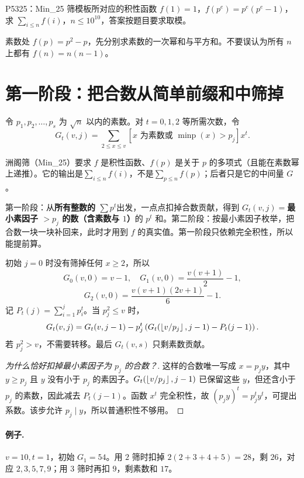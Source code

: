 \begin{problem}{P5325：Min\_25 筛模板所对应的积性函数}
$f(1)=1$，$f(p^e)=p^e(p^e-1)$，求 $\sum_{i\le n}f(i)$，$n\le10^{10}$，答案按题目要求取模。
\end{problem}
\hint 素数处 $f(p)=p^2-p$，先分别求素数的一次幂和与平方和。不要误认为所有 $n$ 上都有 $f(n)=n(n-1)$。

\section{第一阶段：把合数从简单前缀和中筛掉}
令 $p_1,p_2,\ldots,p_s$ 为 $\sqrt n$ 以内的素数。对 $t=0,1,2$ 等所需次数，令
\[
 G_t(v,j)=\sum_{2\le x\le v}
 [x\text{ 为素数或 }\operatorname{minp}(x)>p_j]x^t.
\]

\begin{tip}[前提：洲阁筛的要求与它的输出]
洲阁筛（Min\_25）要求 $f$ 是积性函数、$f(p)$ 是关于 $p$ 的多项式（且能在素数幂上递推）。它的输出是\textbf{$\sum_{i\le n}f(i)$}，不是\textbf{$\sum_{p\le n}f(p)$}；后者只是它的中间量 $G$。
\end{tip}

\begin{tip}[两阶段各自在做什么]
第一阶段：从\textbf{所有整数的 $\sum p^t$}出发，一点点扣掉合数贡献，得到 $G_t(v,j)=$\textbf{最小素因子 $>p_j$ 的数（含素数与 $1$）}的 $p^t$ 和。第二阶段：按最小素因子枚举，把合数一块一块补回来，此时才用到 $f$ 的真实值。第一阶段只依赖完全积性，所以能提前算。
\end{tip}

初始 $j=0$ 时没有筛掉任何 $x\ge2$，所以
\[
G_0(v,0)=v-1,\quad G_1(v,0)=\frac{v(v+1)}2-1,
\]
\[
G_2(v,0)=\frac{v(v+1)(2v+1)}6-1.
\]
记 $P_t(j)=\sum_{i=1}^jp_i^t$。当 $p_j^2\le v$ 时，
\[
 G_t(v,j)=G_t(v,j-1)-p_j^t
 \left(G_t(\left\lfloor v/p_j\right\rfloor,j-1)-P_t(j-1)\right).
\]
若 $p_j^2>v$，不需要转移。最后 $G_t(v,s)$ 只剩素数贡献。


\begin{proof}[为什么恰好扣掉最小素因子为 $p_j$ 的合数？]
这样的合数唯一写成 $x=p_jy$，其中 $y\ge p_j$ 且 $y$ 没有小于 $p_j$ 的素因子。$G_t(\left\lfloor v/p_j\right\rfloor,j-1)$ 已保留这些 $y$，但还含小于 $p_j$ 的素数，因此减去 $P_t(j-1)$。函数 $x^t$ 完全积性，故 $(p_jy)^t=p_j^ty^t$，可提出系数。该步允许 $p_j\mid y$，所以普通积性不够用。
\end{proof}
\paragraph{例子.} $v=10,t=1$，初始 $G_1=54$。用 $2$ 筛时扣掉 $2(2+3+4+5)=28$，剩 $26$，对应 $2,3,5,7,9$；用 $3$ 筛时再扣 $9$，剩素数和 $17$。

